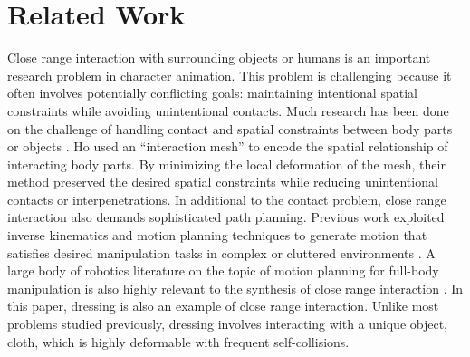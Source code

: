 \section{Related Work}

Close range interaction with surrounding objects or humans is an important research problem in character animation. This problem is challenging because it often involves potentially conflicting goals: maintaining intentional spatial constraints while avoiding unintentional contacts. Much research has been done on the challenge of handling contact and spatial constraints between body parts or objects \cite{Gleicher:1998:RMN,Liu:2006:CCO,Ho:2009:CMS,Kim:2009:SMM,Ho:2010:SRP}. Ho \etal {} used an ``interaction mesh'' to encode the spatial relationship of interacting body parts. By minimizing the local deformation of the mesh, their method preserved the desired spatial constraints while reducing unintentional contacts or interpenetrations. In additional to the contact problem, close range interaction also demands sophisticated path planning. Previous work exploited inverse kinematics and motion planning techniques to generate motion that satisfies desired manipulation tasks in complex or cluttered environments \cite{Kallmann:2003:PCF,Yamane:2004:SAH}. A large body of robotics literature on the topic of motion planning for full-body manipulation is also highly relevant to the synthesis of close range interaction \cite{Harada:2003:PMH,Takubo:2005:PAO,Yoshida:2005:HMP,Nishiwaki:2006:MCS}. In this paper, dressing is also an example of close range interaction. Unlike most problems studied previously, dressing involves interacting with a unique object, cloth, which is highly deformable with frequent self-collisions. 



